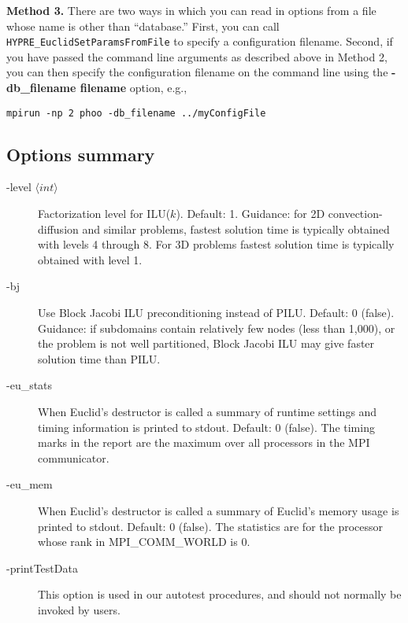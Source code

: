 {\bf Method 3.}
There are two ways in which you can read in options from a file
whose name is other than ``database.''
First, you can call {\tt HYPRE\_EuclidSetParamsFromFile}
to specify a configuration filename.
Second, if you have passed the command line arguments as 
described above in Method 2, 
you can then specify the configuration filename on the command
line using the {\bf -db\_filename filename} option, e.g.,

\begin{display}
\begin{verbatim}
mpirun -np 2 phoo -db_filename ../myConfigFile
\end{verbatim}
\end{display}


\subsection{Options summary}

\begin{description}
\item[-level $\langle int \rangle$] Factorization level for ILU($k$).  
           Default: 1.
           Guidance: for 2D convection-diffusion and similar problems, 
           fastest solution time is typically obtained with levels 4 through
           8.  For 3D problems fastest solution time is typically 
           obtained with level 1.
                    
\item[-bj] Use Block Jacobi ILU preconditioning instead of PILU.
           Default: 0 (false). Guidance: if subdomains contain
           relatively few nodes (less than 1,000), or the problem is
           not well partitioned, Block Jacobi ILU 
           may give faster solution time than PILU.
\item[-eu\_stats] When Euclid's destructor is called a summary of
                 runtime settings and timing information is printed
                 to stdout.  Default: 0 (false).
                 The timing marks in the report are the maximum over 
                 all processors in the MPI communicator.
\item[-eu\_mem] When Euclid's destructor is called a summary of
               Euclid's memory usage is printed to stdout.
               Default: 0 (false).
               The statistics are for the processor whose rank 
               in MPI\_COMM\_WORLD is 0.
\item[-printTestData] This option is used in our autotest procedures,
                 and should not normally be invoked by users.
\end{description}

